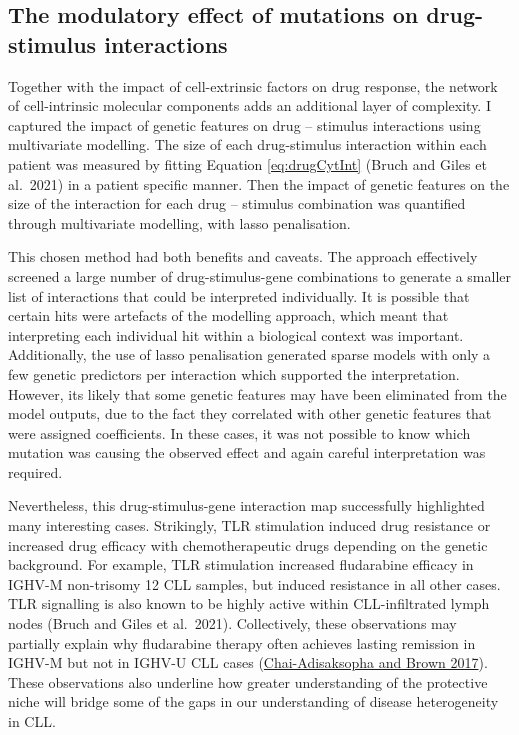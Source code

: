 \documentclass[11pt, a4paper, twosided]{book}
\begin{document}
\hypertarget{the-modulatory-effect-of-mutations-on-drug-stimulus-interactions}{%
\subsection{The modulatory effect of mutations on drug-stimulus interactions}\label{the-modulatory-effect-of-mutations-on-drug-stimulus-interactions}}

Together with the impact of cell-extrinsic factors on drug response, the network of cell-intrinsic molecular components adds an additional layer of complexity. I captured the impact of genetic features on drug -- stimulus interactions using multivariate modelling. The size of each drug-stimulus interaction within each patient was measured by fitting Equation \eqref{eq:drugCytInt} (Bruch and Giles et al.~2021) in a patient specific manner. Then the impact of genetic features on the size of the interaction for each drug -- stimulus combination was quantified through multivariate modelling, with lasso penalisation.

This chosen method had both benefits and caveats. The approach effectively screened a large number of drug-stimulus-gene combinations to generate a smaller list of interactions that could be interpreted individually. It is possible that certain hits were artefacts of the modelling approach, which meant that interpreting each individual hit within a biological context was important. Additionally, the use of lasso penalisation generated sparse models with only a few genetic predictors per interaction which supported the interpretation. However, its likely that some genetic features may have been eliminated from the model outputs, due to the fact they correlated with other genetic features that were assigned coefficients. In these cases, it was not possible to know which mutation was causing the observed effect and again careful interpretation was required.

Nevertheless, this drug-stimulus-gene interaction map successfully highlighted many interesting cases. Strikingly, TLR stimulation induced drug resistance or increased drug efficacy with chemotherapeutic drugs depending on the genetic background. For example, TLR stimulation increased fludarabine efficacy in IGHV-M non-trisomy 12 CLL samples, but induced resistance in all other cases. TLR signalling is also known to be highly active within CLL-infiltrated lymph nodes (Bruch and Giles et al.~2021). Collectively, these observations may partially explain why fludarabine therapy often achieves lasting remission in IGHV-M but not in IGHV-U CLL cases (\protect\hyperlink{ref-Chai2017}{Chai-Adisaksopha and Brown 2017}). These observations also underline how greater understanding of the protective niche will bridge some of the gaps in our understanding of disease heterogeneity in CLL.
\end{document}
